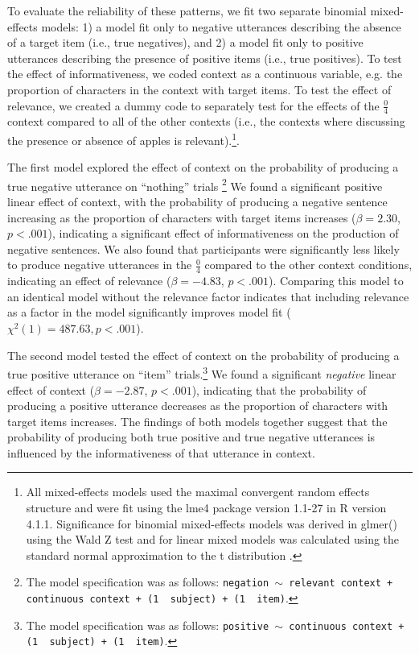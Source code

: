 \documentclass[man, floatsintext, noapacite]{apa6}
\begin{document}
To evaluate the reliability of these patterns, we fit two separate binomial mixed-effects models: 1) a model fit only to negative utterances describing the absence of a target item (i.e., true negatives), and 2) a model fit only to positive utterances describing the presence of positive items (i.e., true positives). To test the effect of informativeness, we coded context as a continuous variable, e.g. the proportion of characters in the context with target items. To test the effect of relevance, we created a dummy code to separately test for the effects of the  $\frac{0}{4}$ context compared to all of the other contexts (i.e., the contexts where discussing the presence or absence of apples is relevant).\footnote{All mixed-effects models used the maximal convergent random effects structure \cite{barr2013} and were fit using the lme4 package version 1.1-27 in R version 4.1.1. Significance for binomial mixed-effects models was derived in glmer() using the Wald Z test and for linear mixed models was calculated using the standard normal approximation to the t distribution \cite{barr2013}.}.

The first model explored the effect of context on the probability of producing a true negative utterance on ``nothing'' trials \footnote{The model specification was as follows: \texttt{negation $\sim$  relevant context + continuous context + (1~\textbar~subject) +  (1~\textbar~item)}.} We found a significant positive linear effect of context, with the probability of producing a negative sentence increasing as the proportion of characters with target items increases ($\beta= 2.30$, $p< .001$), indicating a significant effect of informativeness on the production of negative sentences. We also found that participants were significantly less likely to produce negative utterances in the $\frac{0}{4}$ compared to the other context conditions, indicating an effect of relevance ($\beta= -4.83$, $p< .001$). Comparing this model to an identical model without the relevance factor indicates that including relevance as a factor in the model significantly improves model fit ($\chi^2(1)= 487.63, p < .001$). 

The second model tested the effect of context on the probability of producing a true positive utterance on ``item'' trials.\footnote{The model specification was as follows: \texttt{positive $\sim$  continuous context + (1~\textbar~subject) +  (1~\textbar~item)}.} We found a significant \textit{negative} linear effect of context ($\beta= -2.87$, $p< .001$), indicating that the probability of producing a positive utterance decreases as the proportion of characters with target items increases. The findings of both models together suggest that the probability of producing both true positive and true negative utterances is influenced by the informativeness of that utterance in context.
\end{document}
